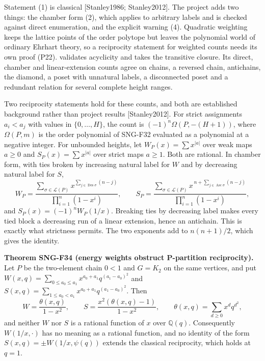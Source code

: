 \documentclass[
  11pt,
  a4paper,
]{report}
\let\singularitytexttt\texttt
\renewcommand{\texttt}[1]{\singularitytexttt{\seqsplit{#1}}}
\begin{document}
Statement (1) is classical {[}Stanley1986; Stanley2012{]}. The project
adds two things: the chamber form (2), which applies to arbitrary labels
and is checked against direct enumeration, and the explicit warning (4).
Quadratic weighting keeps the lattice points of the order polytope but
leaves the polynomial world of ordinary Ehrhart theory, so a reciprocity
statement for weighted counts needs its own proof (P22).
\texttt{src/singularity/orders.py} validates acyclicity and takes the
transitive closure. Its direct, chamber and linear-extension counts
agree on chains, a reversed chain, antichains, the diamond, a poset with
unnatural labels, a disconnected poset and a redundant relation for
several complete height ranges.

Two reciprocity statements hold for these counts, and both are
established background rather than project results {[}Stanley2012{]}.
For strict assignments \(a_i<a_j\) with values in \(\{0,\ldots,H\}\),
the count is \((-1)^n\Omega(P,-(H+1))\), where \(\Omega(P,m)\) is the
order polynomial of SNG-F32 evaluated as a polynomial at a negative
integer. For unbounded heights, let \(W_P(x)=\sum x^{|a|}\) over weak
maps \(a\ge0\) and \(S_P(x)=\sum x^{|a|}\) over strict maps \(a\ge1\).
Both are rational. In chamber form, with ties broken by increasing
natural label for \(W\) and by decreasing natural label for \(S\), \[
W_P=\frac{\sum_{\sigma\in\mathcal L(P)}x^{\sum_{j\in\operatorname{Des}\sigma}(n-j)}}{\prod_{i=1}^n(1-x^i)},\qquad
S_P=\frac{\sum_{\sigma\in\mathcal L(P)}x^{\,n+\sum_{j\in\operatorname{Asc}\sigma}(n-j)}}{\prod_{i=1}^n(1-x^i)},
\] and \(S_P(x)=(-1)^nW_P(1/x)\). Breaking ties by decreasing label
makes every tied block a decreasing run of a linear extension, hence an
antichain. This is exactly what strictness permits. The two exponents
add to \(n(n+1)/2\), which gives the identity.

\textbf{Theorem SNG-F34 (energy weights obstruct P-partition
reciprocity).} Let \(P\) be the two-element chain \(0<1\) and \(G=K_2\)
on the same vertices, and put
\(W(x,q)=\sum_{0\le a_0\le a_1}x^{a_0+a_1}q^{(a_1-a_0)^2}\) and
\(S(x,q)=\sum_{1\le a_0<a_1}x^{a_0+a_1}q^{(a_1-a_0)^2}\). Then \[
W=\frac{\theta(x,q)}{1-x^2},\qquad S=\frac{x^2(\theta(x,q)-1)}{1-x^2},\qquad \theta(x,q)=\sum_{d\ge0}x^dq^{d^2},
\] and neither \(W\) nor \(S\) is a rational function of \(x\) over
\(\mathbb Q(q)\). Consequently \(W(1/x,\cdot)\) has no meaning as a
rational function, and no identity of the form
\(S(x,q)=\pm W(1/x,\psi(q))\) extends the classical reciprocity, which
holds at \(q=1\).
\end{document}
